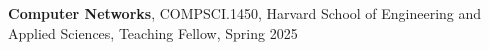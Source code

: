 \textbf{Computer Networks}, COMPSCI.1450, Harvard School of Engineering and Applied Sciences, Teaching Fellow, Spring 2025
